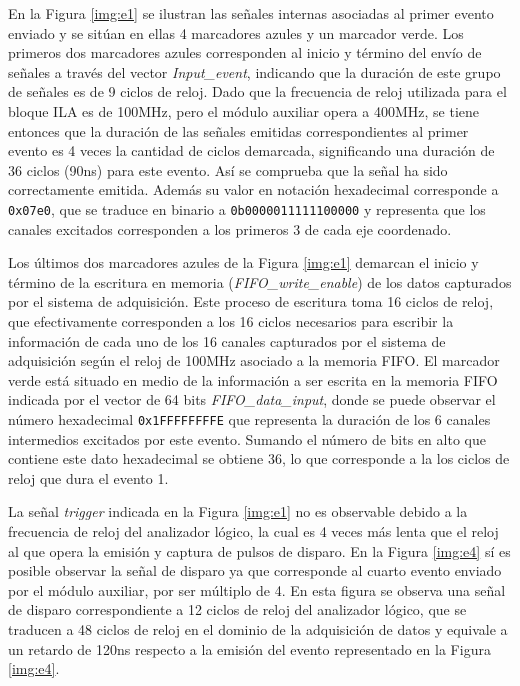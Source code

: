 	En la Figura \ref{img:e1} se ilustran las señales internas asociadas al primer evento enviado y se sitúan en ellas 4 marcadores azules y un marcador verde. Los primeros dos marcadores azules corresponden al inicio y término del envío de señales a través del vector \textit{Input\_event}, indicando que la duración de este grupo de señales es de 9 ciclos de reloj. Dado que la frecuencia de reloj utilizada para el bloque ILA es de 100MHz, pero el módulo auxiliar opera a 400MHz, se tiene entonces que la duración de las señales emitidas correspondientes al primer evento es 4 veces la cantidad de ciclos demarcada, significando una duración de 36 ciclos (90ns) para este evento. Así se comprueba que la señal ha sido correctamente emitida. Además su valor en notación hexadecimal corresponde a \texttt{0x07e0}, que se traduce en binario a \texttt{0b0000011111100000} y representa que los canales excitados corresponden a los primeros 3 de cada eje coordenado.  %
	
	Los últimos dos marcadores azules de la Figura \ref{img:e1} demarcan el inicio y término de la escritura en memoria (\textit{FIFO\_write\_enable}) de los datos capturados por el sistema de adquisición. Este proceso de escritura toma 16 ciclos de reloj, que efectivamente corresponden a los 16 ciclos necesarios para escribir la información de cada uno de los 16 canales capturados por el sistema de adquisición según el reloj de 100MHz asociado a la memoria FIFO. El marcador verde está situado en medio de la información a ser escrita en la memoria FIFO indicada por el vector de 64 bits \textit{FIFO\_data\_input}, donde se puede observar el número hexadecimal \texttt{0x1FFFFFFFFE} que representa la duración de los 6 canales intermedios excitados por este evento. Sumando el número de bits en alto que contiene este dato hexadecimal se obtiene 36, lo que corresponde a la los ciclos de reloj que dura el evento 1.
	
	La señal \textit{trigger} indicada en la Figura \ref{img:e1} no es observable debido a la frecuencia de reloj del analizador lógico, la cual es 4 veces más lenta que el reloj al que opera la emisión y captura de pulsos de disparo. En la Figura \ref{img:e4} sí es posible observar la señal de disparo ya que corresponde al cuarto evento enviado por el módulo auxiliar, por ser múltiplo de 4. En esta figura se observa una señal de disparo correspondiente a 12 ciclos de reloj del analizador lógico, que se traducen a 48 ciclos de reloj en el dominio de la adquisición de datos y equivale a un retardo de 120ns respecto a la emisión del evento representado en la Figura \ref{img:e4}.
	
